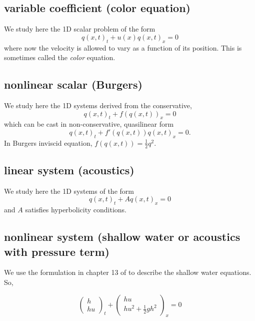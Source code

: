 \documentclass[12pt]{article}
\begin{document}
\subsection{variable coefficient (color equation)}
We study here the 1D scalar problem of the form
\begin{equation}
q(x,t)_{t} + u(x) q(x,t)_{x}=0
\end{equation}
\noindent where now the velocity is allowed to vary as a function of its position. This is sometimes called the {\it color} equation.

\subsection{nonlinear scalar (Burgers)}
We study here the 1D systems derived from the conservative, 
\begin{equation}
q(x,t)_{t} + f(q(x,t))_{x}=0
\end{equation}
which can be cast in non-conservative, quasilinear form 
 \begin{equation}
q(x,t)_{t} + f'(q(x,t))q(x,t)_{x}=0 .
\end{equation}
In Burgers inviscid equation, $f(q(x,t))=\frac{1}{2}q^2$.

\subsection{linear system (acoustics)}
We study here the 1D systems of the form
\begin{equation}
q(x,t)_{t} + A q(x,t)_{x}=0
\end{equation}
\noindent and $A$ satisfies hyperbolicity conditions.

\subsection{nonlinear system (shallow water or acoustics with pressure term)}
We use the formulation in chapter 13 of \cite{levFVMHP} to describe the shallow water equations.
So, 

\begin{equation}
\left( \begin{array}{c}
h  \\
h u\end{array} \right)_{t} + 
\left( \begin{array}{c} 
hu \\
hu^2 + \frac{1}{2}gh^2\end{array} \right)_{x} = 0
\end{equation}
\end{document}
